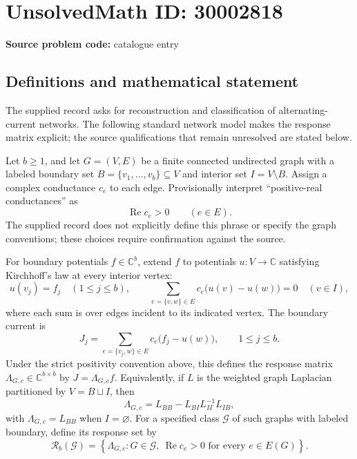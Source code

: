 \documentclass[11pt]{article}
\newcommand{\C}{\mathbb{C}}
\begin{document}
\section*{UnsolvedMath ID: 30002818}
\textbf{Source problem code:} catalogue entry
\subsection{Definitions and mathematical statement}
The supplied record asks for reconstruction and classification of alternating-current networks. The following standard network model makes the response matrix explicit; the source qualifications that remain unresolved are stated below.

Let \(b\geq 1\), and let \(G=(V,E)\) be a finite connected undirected graph with a labeled boundary set \(B=\{v_1,\ldots,v_b\}\subseteq V\) and interior set \(I=V\setminus B\). Assign a complex conductance \(c_e\) to each edge. Provisionally interpret ``positive-real conductances'' as
\[
\operatorname{Re}c_e>0\qquad(e\in E).
\]
The supplied record does not explicitly define this phrase or specify the graph conventions; these choices require confirmation against the source.

For boundary potentials \(f\in\C^b\), extend \(f\) to potentials \(u:V\to\C\) satisfying Kirchhoff's law at every interior vertex:
\[
u(v_j)=f_j\quad(1\leq j\leq b),\qquad
\sum_{e=\{v,w\}\in E}c_e\bigl(u(v)-u(w)\bigr)=0\quad(v\in I),
\]
where each sum is over edges incident to its indicated vertex. The boundary current is
\[
J_j=\sum_{e=\{v_j,w\}\in E}c_e\bigl(f_j-u(w)\bigr),\qquad 1\leq j\leq b.
\]
Under the strict positivity convention above, this defines the response matrix \(\Lambda_{G,c}\in\C^{b\times b}\) by \(J=\Lambda_{G,c}f\). Equivalently, if \(L\) is the weighted graph Laplacian partitioned by \(V=B\sqcup I\), then
\[
\Lambda_{G,c}=L_{BB}-L_{BI}L_{II}^{-1}L_{IB},
\]
with \(\Lambda_{G,c}=L_{BB}\) when \(I=\varnothing\). For a specified class \(\mathcal G\) of such graphs with labeled boundary, define its response set by
\[
\mathcal R_b(\mathcal G)=\left\{\Lambda_{G,c}:G\in\mathcal G,\ \operatorname{Re}c_e>0\text{ for every }e\in E(G)\right\}.
\]
\end{document}
